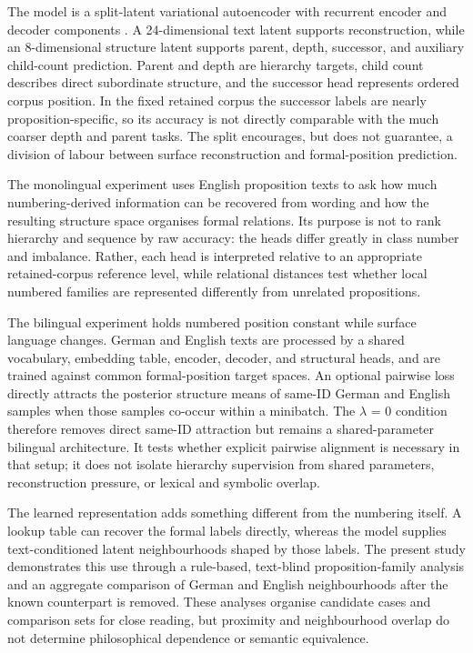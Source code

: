 \documentclass[webpdf,modern,medium,namedate]{oup-authoring-template}
\begin{document}
The model is a split-latent variational autoencoder with recurrent encoder and decoder components \citep{kingma2014autoencoding,cho2014learning}. A 24-dimensional text latent supports reconstruction, while an 8-dimensional structure latent supports parent, depth, successor, and auxiliary child-count prediction. Parent and depth are hierarchy targets, child count describes direct subordinate structure, and the successor head represents ordered corpus position. In the fixed retained corpus the successor labels are nearly proposition-specific, so its accuracy is not directly comparable with the much coarser depth and parent tasks. The split encourages, but does not guarantee, a division of labour between surface reconstruction and formal-position prediction.

The monolingual experiment uses English proposition texts to ask how much numbering-derived information can be recovered from wording and how the resulting structure space organises formal relations. Its purpose is not to rank hierarchy and sequence by raw accuracy: the heads differ greatly in class number and imbalance. Rather, each head is interpreted relative to an appropriate retained-corpus reference level, while relational distances test whether local numbered families are represented differently from unrelated propositions.

The bilingual experiment holds numbered position constant while surface language changes. German and English texts are processed by a shared vocabulary, embedding table, encoder, decoder, and structural heads, and are trained against common formal-position target spaces. An optional pairwise loss directly attracts the posterior structure means of same-ID German and English samples when those samples co-occur within a minibatch. The $\lambda$ = 0 condition therefore removes direct same-ID attraction but remains a shared-parameter bilingual architecture. It tests whether explicit pairwise alignment is necessary in that setup; it does not isolate hierarchy supervision from shared parameters, reconstruction pressure, or lexical and symbolic overlap.

The learned representation adds something different from the numbering itself. A lookup table can recover the formal labels directly, whereas the model supplies text-conditioned latent neighbourhoods shaped by those labels. The present study demonstrates this use through a rule-based, text-blind proposition-family analysis and an aggregate comparison of German and English neighbourhoods after the known counterpart is removed. These analyses organise candidate cases and comparison sets for close reading, but proximity and neighbourhood overlap do not determine philosophical dependence or semantic equivalence.
\end{document}
